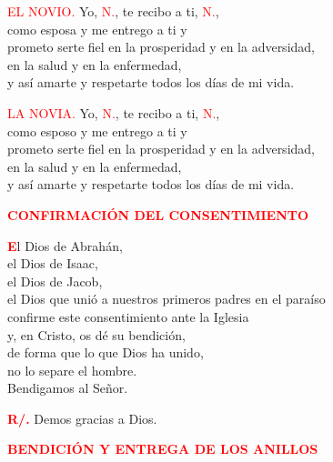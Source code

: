 \documentclass[12pt, letterpaper]{report}
\begin{document}
\newpage

\textcolor{red}{EL NOVIO.} \newline
Yo, \textcolor{red}{N.}, te recibo a ti, \textcolor{red}{N.}, \\
como esposa y me entrego a ti y \\
prometo serte fiel en la prosperidad y en la adversidad, \\
en la salud y en la enfermedad, \\
y as\'i amarte y respetarte todos los d\'ias de mi vida. \newline

\textcolor{red}{LA NOVIA.} \newline
Yo, \textcolor{red}{N.}, te recibo a ti, \textcolor{red}{N.}, \\
como esposo y me entrego a ti y \\
prometo serte fiel en la prosperidad y en la adversidad, \\
en la salud y en la enfermedad, \\
y as\'i amarte y respetarte todos los d\'ias de mi vida. \newline


\Large {\bfseries \textcolor{red}{CONFIRMACI\'ON DEL CONSENTIMIENTO}}

\lettrine[lines=1]{\bfseries \textcolor{red}{E}}{}\Large l Dios de Abrah\'an, \\
el Dios de Isaac, \\
el Dios de Jacob, \\
el Dios que uni\'o a nuestros primeros padres en el para\'iso \\
confirme este consentimiento ante la Iglesia \\
y, en Cristo, os d\'e su bendici\'on, \\
de forma que lo que Dios ha unido, \\
no lo separe el hombre.\\
Bendigamos al Se\~nor. \newline

\Large \hspace{-0.9cm} {\bfseries \textcolor{red}{R/.}} \hspace{0.5cm} Demos gracias a Dios. \newline

\Large {\bfseries \textcolor{red}{BENDICI\'ON Y ENTREGA DE LOS ANILLOS}} \newline
\end{document}
